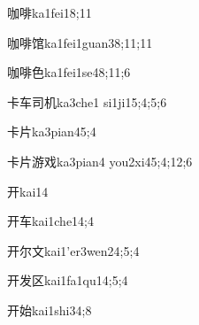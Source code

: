 
\begin{verbete}{咖啡}{ka1fei1}{8;11}
\end{verbete}

\begin{verbete}{咖啡馆}{ka1fei1guan3}{8;11;11}
\end{verbete}

\begin{verbete}{咖啡色}{ka1fei1se4}{8;11;6}
\end{verbete}

\begin{verbete}{卡车司机}{ka3che1 si1ji1}{5;4;5;6}
\end{verbete}

\begin{verbete}{卡片}{ka3pian4}{5;4}
\end{verbete}

\begin{verbete}{卡片游戏}{ka3pian4 you2xi4}{5;4;12;6}
\end{verbete}

\begin{verbete}{开}{kai1}{4}
\end{verbete}

\begin{verbete}{开车}{kai1che1}{4;4}
\end{verbete}

\begin{verbete}{开尔文}{kai1'er3wen2}{4;5;4}
\end{verbete}

\begin{verbete}{开发区}{kai1fa1qu1}{4;5;4}
\end{verbete}

\begin{verbete}{开始}{kai1shi3}{4;8}
\end{verbete}

